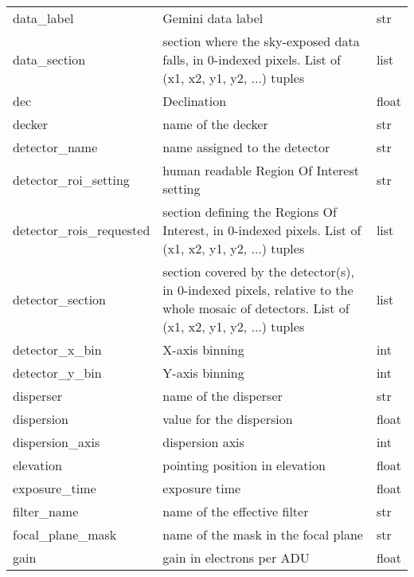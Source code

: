 \documentclass[letterpaper,10pt,english]{sphinxmanual}
\begin{document}
\begin{longtable}{|l|l|l|}
data\_label
 & 
Gemini data label
 & 
str
\\

data\_section
 & 
section where the sky-exposed data falls, in 0-indexed pixels.
List of (x1, x2, y1, y2, ...) tuples
 & 
list
\\

dec
 & 
Declination
 & 
float
\\

decker
 & 
name of the decker
 & 
str
\\

detector\_name
 & 
name assigned to the detector
 & 
str
\\

detector\_roi\_setting
 & 
human readable Region Of Interest setting
 & 
str
\\

detector\_rois\_requested
 & 
section defining the Regions Of Interest, in 0-indexed pixels.
List of (x1, x2, y1, y2, ...) tuples
 & 
list
\\

detector\_section
 & 
section covered by the detector(s), in 0-indexed pixels,
relative to the whole mosaic of detectors.
List of (x1, x2, y1, y2, ...) tuples
 & 
list
\\

detector\_x\_bin
 & 
X-axis binning
 & 
int
\\

detector\_y\_bin
 & 
Y-axis binning
 & 
int
\\

disperser
 & 
name of the disperser
 & 
str
\\

dispersion
 & 
value for the dispersion
 & 
float
\\

dispersion\_axis
 & 
dispersion axis
 & 
int
\\

elevation
 & 
pointing position in elevation
 & 
float
\\

exposure\_time
 & 
exposure time
 & 
float
\\

filter\_name
 & 
name of the effective filter
 & 
str
\\

focal\_plane\_mask
 & 
name of the mask in the focal plane
 & 
str
\\

gain
 & 
gain in electrons per ADU
 & 
float
\\


\end{longtable}
\end{document}
